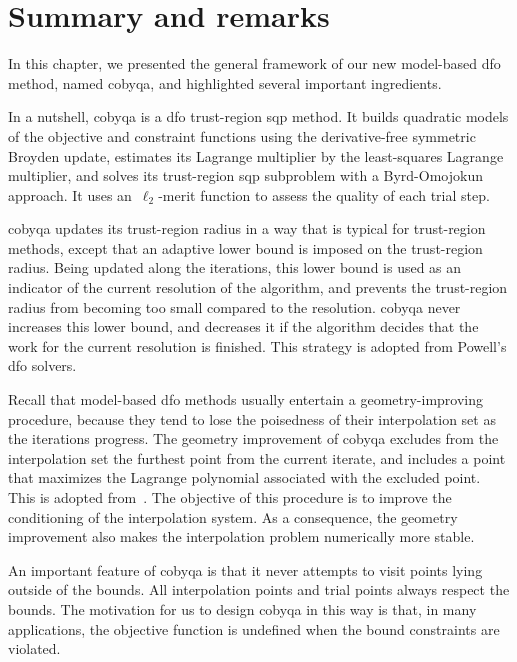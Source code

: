\section{Summary and remarks}

In this chapter, we presented the general framework of our new model-based \gls{dfo} method, named \gls{cobyqa}, and highlighted several important ingredients.

In a nutshell, \gls{cobyqa} is a \gls{dfo} trust-region \gls{sqp} method.
It builds quadratic models of the objective and constraint functions using the derivative-free symmetric Broyden update, estimates its Lagrange multiplier by the least-squares Lagrange multiplier, and solves its trust-region \gls{sqp} subproblem with a Byrd-Omojokun approach.
It uses an~$\ell_2$-merit function to assess the quality of each trial step.

\Gls{cobyqa} updates its trust-region radius in a way that is typical for trust-region methods, except that an adaptive lower bound is imposed on the trust-region radius.
Being updated along the iterations, this lower bound is used as an indicator of the current resolution of the algorithm, and prevents the trust-region radius from becoming too small compared to the resolution.
\Gls{cobyqa} never increases this lower bound, and decreases it if the algorithm decides that the work for the current resolution is finished.
This strategy is adopted from Powell's \gls{dfo} solvers.

Recall that model-based \gls{dfo} methods usually entertain a geometry-improving procedure, because they tend to lose the poisedness of their interpolation set as the iterations progress.
The geometry improvement of \gls{cobyqa} excludes from the interpolation set the furthest point from the current iterate, and includes a point that maximizes the Lagrange polynomial associated with the excluded point.
This is adopted from~\cite{Powell_2006,Powell_2009}.
The objective of this procedure is to improve the conditioning of the interpolation system.
As a consequence, the geometry improvement also makes the interpolation problem numerically more stable.

An important feature of \gls{cobyqa} is that it never attempts to visit points lying outside of the bounds.
All interpolation points and trial points always respect the bounds.
The motivation for us to design \gls{cobyqa} in this way is that, in many applications, the objective function is undefined when the bound constraints are violated.

